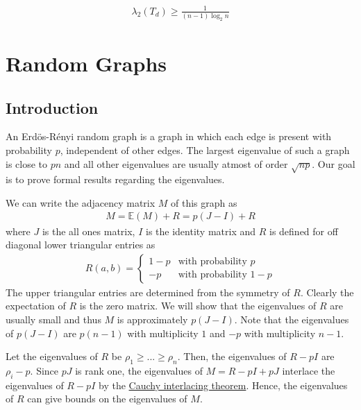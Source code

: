 \documentclass{math}
\newcommand{\expect}{\mathbb{E}}
\begin{document}
\begin{lemma}
    \begin{align*}
        \lambda_2(T_d) \geq \frac{1}{(n - 1) \log_2 n}
    \end{align*}
\end{lemma}

\section{Random Graphs}

\subsection{Introduction}

An Erd\"{o}s-R\'{e}nyi random graph is a graph in which each edge is present with probability $p$, independent of other edges.
The largest eigenvalue of such a graph is close to $pn$ and all other eigenvalues are usually atmost of order $\sqrt{np}$.
Our goal is to prove formal results regarding the eigenvalues.

We can write the adjacency matrix $M$ of this graph as
\begin{align*}
    M = \expect(M) + R = p(J - I) + R
\end{align*}
where $J$ is the all ones matrix, $I$ is the identity matrix and $R$ is defined for off diagonal lower triangular entries as
\begin{align*}
    R(a, b) = \begin{cases}
                  1 - p & \text{with probability $p$}   \\
                  -p    & \text{with probability $1-p$}
              \end{cases}
\end{align*}
The upper triangular entries are determined from the symmetry of $R$.
Clearly the expectation of $R$ is the zero matrix.
We will show that the eigenvalues of $R$ are usually small
and thus $M$ is approximately $p(J - I)$. Note that the eigenvalues of $p(J - I)$ are $p(n - 1)$ with multiplicity $1$ and $-p$ with multiplicity $n - 1$.

Let the eigenvalues of $R$ be $\rho_1 \geq ... \geq \rho_n$.
Then, the eigenvalues of $R - pI$ are $\rho_i - p$.
Since $pJ$ is rank one, the eigenvalues of $M = R - pI + pJ$ interlace the eigenvalues of $R - pI$ by the \hyperref[thm:cauchy-rank-one]{Cauchy interlacing theorem}.
Hence, the eigenvalues of $R$ can give bounds on the eigenvalues of $M$.
\end{document}
